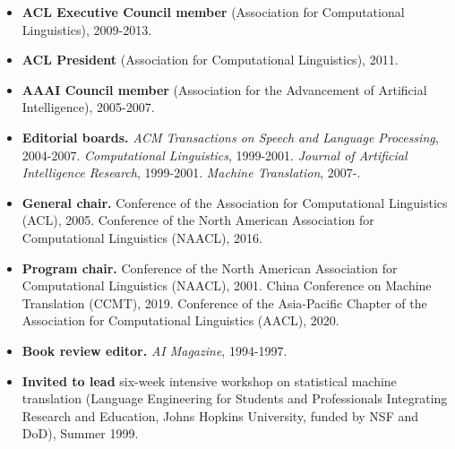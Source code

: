 
\begin{itemize}

\item {\bf ACL Executive Council member} (Association for Computational
Linguistics), 2009-2013.

\item {\bf ACL President} (Association for Computational Linguistics), 2011.

\item {\bf AAAI Council member} (Association for the Advancement of
Artificial Intelligence), 2005-2007.

\item {\bf Editorial boards.}  
 {\em ACM Transactions on Speech and Language Processing}, 2004-2007.
 {\em Computational Linguistics}, 1999-2001.
 {\em Journal of Artificial Intelligence Research}, 1999-2001.
 {\em Machine Translation}, 2007-.

\item {\bf General chair.}  Conference of the Association
for Computational Linguistics (ACL), 2005.
Conference of the North American Association
for Computational Linguistics (NAACL), 2016.

\item {\bf Program chair.}  Conference of the North American Association
for Computational Linguistics (NAACL), 2001.
China Conference on Machine Translation (CCMT), 2019.
Conference of the Asia-Pacific Chapter of the Association for
Computational Linguistics (AACL), 2020.


\item {\bf Book review editor.}  {\em AI Magazine}, 1994-1997.

\item {\bf Invited to lead} six-week intensive workshop on statistical
machine translation (Language Engineering for Students 
and Professionals Integrating Research and Education,
Johns Hopkins University, funded by NSF and DoD), Summer 1999.

\end{itemize}

